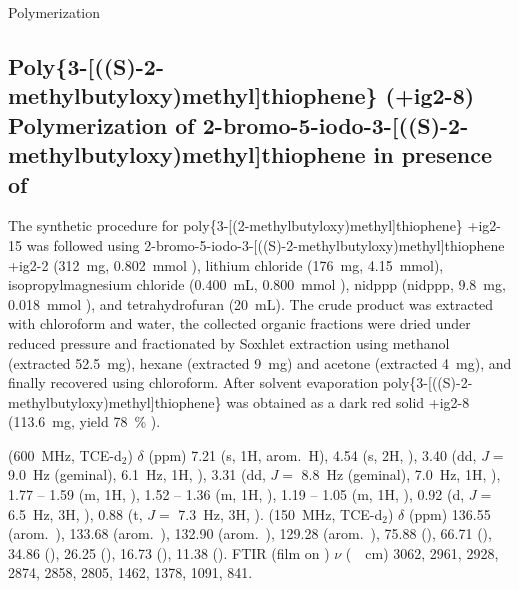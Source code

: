 \begin{section}{Polymerization}
\subsection[Poly\{3-[((S)-2-methyl\-butyl\-oxy)\-methyl{]}\-thio\-phene\} (\cmpd+{ig2-8})]{Poly\{3-[((S)-2-methyl\-butyl\-oxy)\-methyl{]}\-thio\-phene\} (\cmpd+{ig2-8}) \\ Polymerization of 2-bromo-5-iodo-3-[((S)-2-methyl\-butyl\-oxy)\-methyl{]}\-thio\-phene in presence of }
\label{sec:ig2-8}
The synthetic procedure for poly\{3-[(2-methyl\-butyl\-oxy)\-methyl{]}\-thio\-phene\} \cmpd+{ig2-15} was followed using 2-bromo-5-iodo-3-[((S)-2-methyl\-butyl\-oxy)\-methyl{]}\-thio\-phene \cmpd+{ig2-2} (\SI{312}{\mg}, \SI{0.802}{\mmol}%
), lithium chloride (\SI{176}{\mg}, \SI{4.15}{\mmol}), iso\-propyl\-magnesium chloride (\SI{0.400}{\mL}, \SI{0.800}{\mmol}%
), \acrlong{nidppp} (\acrshort{nidppp}, \SI{9.8}{\mg}, \SI{0.018}{\mmol}%
), and tetrahydrofuran (\SI{20}{\mL}). 
The crude product was extracted with chloroform and water, the collected organic fractions were dried under reduced pressure and fractionated by Soxhlet extraction using methanol (extracted \SI{52.5}{\mg}), hexane (extracted \SI{9}{\mg}) and acetone (extracted \SI{4}{\mg}), and finally recovered using chloroform. After solvent evaporation poly\{3-[((S)-2-methyl\-butyl\-oxy)\-methyl{]}\-thio\-phene\} was obtained as a dark red solid \cmpd+{ig2-8} (\SI{113.6}{\mg}, yield 78~\%%
).

{\HNMR} (\SI{600}{\MHz}, \gls{TCE}-d$_2$) $\delta$ (ppm) 7.21 (s, 1H, arom.\ H), 4.54 (s, 2H, ), 3.40 (dd, $J =$ \SI{9.0}{\Hz} (geminal), \SI{6.1}{\Hz}, 1H, ), 3.31 (dd, $J =$ \SI{8.8}{\Hz} (geminal), \SI{7.0}{\Hz}, 1H, ), 1.77 -- 1.59 (m, 1H, ), 1.52 -- 1.36 (m, 1H, ), 1.19 -- 1.05 (m, 1H, ), 0.92 (d, $J =$ \SI{6.5}{\Hz}, 3H, ), 0.88 (t, $J =$ \SI{7.3}{\Hz}, 3H, ).
{\CNMR} (\SI{150}{\MHz}, \gls{TCE}-d$_2$) $\delta$ (ppm) 136.55 (arom.\ ), 133.68 (arom.\ ), 132.90 (arom.\ ), 129.28 (arom.\ ), 75.88 (), 66.71 (), 34.86 (), 26.25 (), 16.73 (), 11.38 ().
\gls{FTIR} (film on ) $\nu$ (\SI{}{\per\cm}) 3062, 2961, 2928, 2874, 2858, 2805, 1462, 1378, 1091, 841. 

\end{section}
